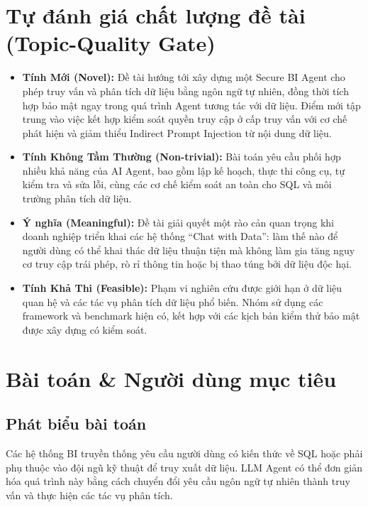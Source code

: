 \section{Tự đánh giá chất lượng đề tài (Topic-Quality Gate)}

\begin{itemize}
\item \textbf{Tính Mới (Novel):} Đề tài hướng tới xây dựng một Secure BI Agent cho phép truy vấn và phân tích dữ liệu bằng ngôn ngữ tự nhiên, đồng thời tích hợp bảo mật ngay trong quá trình Agent tương tác với dữ liệu. Điểm mới tập trung vào việc kết hợp kiểm soát quyền truy cập ở cấp truy vấn với cơ chế phát hiện và giảm thiểu Indirect Prompt Injection từ nội dung dữ liệu.

\item \textbf{Tính Không Tầm Thường (Non-trivial):} Bài toán yêu cầu phối hợp nhiều khả năng của AI Agent, bao gồm lập kế hoạch, thực thi công cụ, tự kiểm tra và sửa lỗi, cùng các cơ chế kiểm soát an toàn cho SQL và môi trường phân tích dữ liệu.

\item \textbf{Ý nghĩa (Meaningful):} Đề tài giải quyết một rào cản quan trọng khi doanh nghiệp triển khai các hệ thống ``Chat with Data'': làm thế nào để người dùng có thể khai thác dữ liệu thuận tiện mà không làm gia tăng nguy cơ truy cập trái phép, rò rỉ thông tin hoặc bị thao túng bởi dữ liệu độc hại.

\item \textbf{Tính Khả Thi (Feasible):} Phạm vi nghiên cứu được giới hạn ở dữ liệu quan hệ và các tác vụ phân tích dữ liệu phổ biến. Nhóm sử dụng các framework và benchmark hiện có, kết hợp với các kịch bản kiểm thử bảo mật được xây dựng có kiểm soát.

\end{itemize}

\section{Bài toán \& Người dùng mục tiêu}

\subsection{Phát biểu bài toán}

Các hệ thống BI truyền thống yêu cầu người dùng có kiến thức về SQL hoặc phải phụ thuộc vào đội ngũ kỹ thuật để truy xuất dữ liệu. LLM Agent có thể đơn giản hóa quá trình này bằng cách chuyển đổi yêu cầu ngôn ngữ tự nhiên thành truy vấn và thực hiện các tác vụ phân tích.

